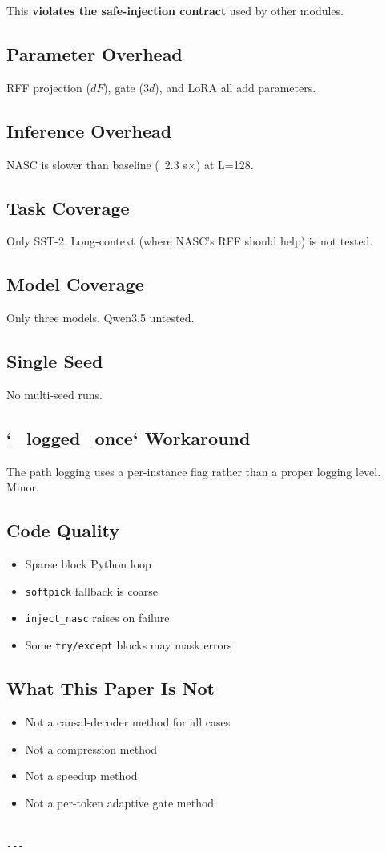 This \textbf{violates the safe-injection contract} used by other modules.

\subsection{Parameter Overhead}

RFF projection ($dF$), gate ($3d$), and LoRA all add parameters.

\subsection{Inference Overhead}

NASC is slower than baseline (~2.3 s$\times$) at L=128.

\subsection{Task Coverage}

Only SST-2. Long-context (where NASC's RFF should help) is not tested.

\subsection{Model Coverage}

Only three models. Qwen3.5 untested.

\subsection{Single Seed}

No multi-seed runs.

\subsection{`\_logged\_once` Workaround}

The path logging uses a per-instance flag rather than a proper logging 
level. Minor.

\subsection{Code Quality}

\begin{itemize}
\item Sparse block Python loop
\item \texttt{softpick} fallback is coarse
\item \texttt{inject\_nasc} raises on failure
\item Some \texttt{try/except} blocks may mask errors

\end{itemize}
\subsection{What This Paper Is Not}

\begin{itemize}
\item Not a causal-decoder method for all cases
\item Not a compression method
\item Not a speedup method
\item Not a per-token adaptive gate method
\end{itemize}
\begin{lstlisting}

---
\end{lstlisting}